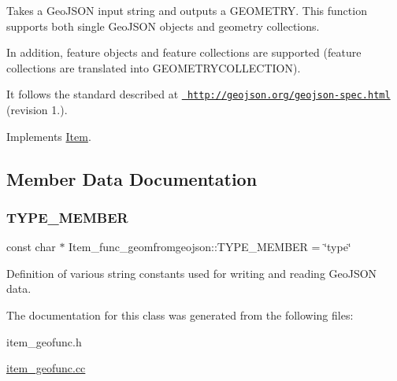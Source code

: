 Takes a Geo\+J\+S\+ON input string and outputs a G\+E\+O\+M\+E\+T\+RY. This function supports both single Geo\+J\+S\+ON objects and geometry collections.

In addition, feature objects and feature collections are supported (feature collections are translated into G\+E\+O\+M\+E\+T\+R\+Y\+C\+O\+L\+L\+E\+C\+T\+I\+ON).

It follows the standard described at \href{http://geojson.org/geojson-spec.html}\texttt{ http\+://geojson.\+org/geojson-\/spec.\+html} (revision 1.). 

Implements \mbox{\hyperlink{classItem}{Item}}.



\subsection{Member Data Documentation}
\mbox{\label{classItem__func__geomfromgeojson_a0965464603a3ab0282ed4fb493381232}} 
\subsubsection{\texorpdfstring{T\+Y\+P\+E\+\_\+\+M\+E\+M\+B\+ER}{TYPE\_MEMBER}}
{\footnotesize\ttfamily const char $\ast$ Item\+\_\+func\+\_\+geomfromgeojson\+::\+T\+Y\+P\+E\+\_\+\+M\+E\+M\+B\+ER = \char`\"{}type\char`\"{}\hspace{0.3cm}{\ttfamily [static]}}

Definition of various string constants used for writing and reading Geo\+J\+S\+ON data. 

The documentation for this class was generated from the following files\+:\begin{DoxyCompactItemize}
\item 
item\+\_\+geofunc.\+h\item 
\mbox{\hyperlink{item__geofunc_8cc}{item\+\_\+geofunc.\+cc}}\end{DoxyCompactItemize}
